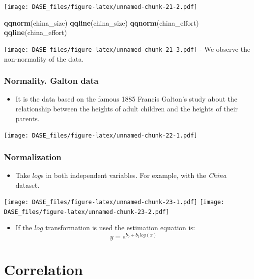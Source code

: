 \documentclass[]{book}
\newenvironment{Shaded}{\begin{snugshade}}{\end{snugshade}}
\newcommand{\KeywordTok}[1]{\textcolor[rgb]{0.13,0.29,0.53}{\textbf{{#1}}}}
\newcommand{\NormalTok}[1]{{#1}}
\providecommand{\tightlist}{%
  \setlength{\itemsep}{0pt}\setlength{\parskip}{0pt}}
\begin{document}
\texttt{[image: DASE\_files/figure-latex/unnamed-chunk-21-2.pdf]}

\begin{Shaded}
\begin{Highlighting}[]
\KeywordTok{qqnorm}\NormalTok{(china_size)}
\KeywordTok{qqline}\NormalTok{(china_size)}
\KeywordTok{qqnorm}\NormalTok{(china_effort)}
\KeywordTok{qqline}\NormalTok{(china_effort)}
\end{Highlighting}
\end{Shaded}

\texttt{[image: DASE\_files/figure-latex/unnamed-chunk-21-3.pdf]} - We
observe the non-normality of the data.

\subsubsection{Normality. Galton data}\label{normality.-galton-data}

\begin{itemize}
\tightlist
\item
  It is the data based on the famous 1885 Francis Galton's study about
  the relationship between the heights of adult children and the heights
  of their parents.
\end{itemize}

\texttt{[image: DASE\_files/figure-latex/unnamed-chunk-22-1.pdf]}

\subsubsection{Normalization}\label{normalization}

\begin{itemize}
\tightlist
\item
  Take \(log\)s in both independent variables. For example, with the
  \emph{China} dataset.
\end{itemize}

\texttt{[image: DASE\_files/figure-latex/unnamed-chunk-23-1.pdf]}
\texttt{[image: DASE\_files/figure-latex/unnamed-chunk-23-2.pdf]}

\begin{itemize}
\tightlist
\item
  If the \(log\) transformation is used the estimation equation is:
  \[y= e^{b_0 + b_1 log(x)} \]
\end{itemize}

\section{Correlation}\label{correlation}
\end{document}

